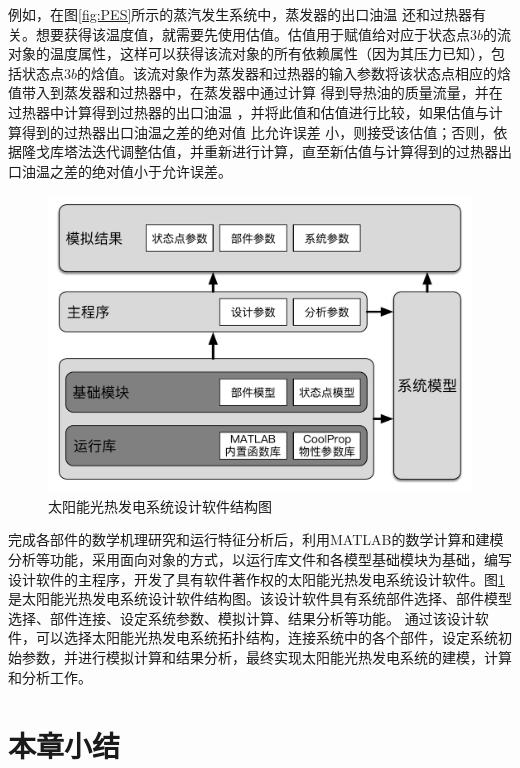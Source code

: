 例如，在图\ref{fig:PES}所示的蒸汽发生系统中，蒸发器的出口油温%
还和过热器有关。想要获得该温度值，就需要先使用估值。估值用于赋值给对应于状态点$3b$的流对象的温度属性，这样可以获得该流对象的所有依赖属性（因为其压力已知），包括状态点$3b$的焓值。该流对象作为蒸发器和过热器的输入参数将该状态点相应的焓值带入到蒸发器和过热器中，在蒸发器中通过计算
得到导热油的质量流量，并在过热器中计算得到过热器的出口油温
，并将此值和估值进行比较，如果估值与计算得到的过热器出口油温之差的绝对值
比允许误差
小，则接受该估值；否则，依据隆戈库塔法迭代调整估值，并重新进行计算，直至新估值与计算得到的过热器出口油温之差的绝对值小于允许误差。

\begin{figure}[htbp]
\begin{center}
	\includegraphics[width = 0.8\columnwidth]{fig/SystemFlow}
	\caption{太阳能光热发电系统设计软件结构图}
	\label{fig:SystemFlow}
\end{center}
\end{figure}

完成各部件的数学机理研究和运行特征分析后，利用MATLAB的数学计算和建模分析等功能，采用面向对象的方式，以运行库文件和各模型基础模块为基础，编写设计软件的主程序，开发了具有软件著作权的太阳能光热发电系统设计软件。图\ref{fig:SystemFlow}是太阳能光热发电系统设计软件结构图。该设计软件具有系统部件选择、部件模型选择、部件连接、设定系统参数、模拟计算、结果分析等功能。
通过该设计软件，可以选择太阳能光热发电系统拓扑结构，连接系统中的各个部件，设定系统初始参数，并进行模拟计算和结果分析，最终实现太阳能光热发电系统的建模，计算和分析工作。

\section{本章小结}


